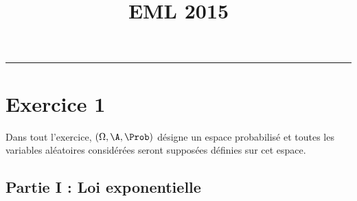 \documentclass[11pt]{article}%
\title{\bf \vspace{-1.6cm} EML 2015} %
\author{} %
\date{} %
\begin{document}
\maketitle %
\vspace{-1.2cm}\hrule %
\thispagestyle{fancy}

\vspace*{.4cm}


\section*{Exercice 1}

\noindent
Dans tout l'exercice, $(\Omega, \A,\Prob)$ désigne un espace
probabilisé et toutes les variables aléatoires considérées seront
supposées définies sur cet espace.

\subsection*{Partie I : Loi exponentielle}
\end{document}
